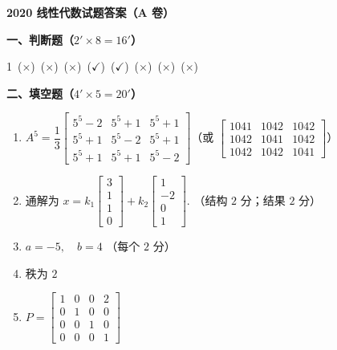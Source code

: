 \documentclass[a4paper,11pt]{ctexart}
\begin{document}
\begin{center}
  {\Large\bfseries 2020 线性代数试题答案（A 卷）}
\end{center}

\vspace{0.6em}

\textbf{一、判断题（$2' \times 8 = 16'$）}

\vspace{0.3em}
1\ ($\times$)\ ($\times$)\ ($\times$)\ ($\checkmark$)\ ($\checkmark$)\ ($\times$)\ ($\times$)\ ($\times$)

\vspace{0.9em}

\textbf{二、填空题（$4' \times 5 = 20'$）}

\begin{enumerate}[label=\arabic*., leftmargin=2em, itemsep=0.6em, topsep=0.4em]
  \item $A^5 = \dfrac{1}{3}\begin{bmatrix} 5^5-2 & 5^5+1 & 5^5+1 \\ 5^5+1 & 5^5-2 & 5^5+1 \\ 5^5+1 & 5^5+1 & 5^5-2 \end{bmatrix}$（或 $\begin{bmatrix} 1041 & 1042 & 1042 \\ 1042 & 1041 & 1042 \\ 1042 & 1042 & 1041 \end{bmatrix}$）

  \item 通解为 $x = k_1\begin{bmatrix} 3 \\ 1 \\ 1 \\ 0 \end{bmatrix} + k_2\begin{bmatrix} 1 \\ -2 \\ 0 \\ 1 \end{bmatrix}$. \qquad （结构 $2$ 分；结果 $2$ 分）

  \item $a = -5,\quad b = 4$ \qquad （每个 $2$ 分）

  \item 秩为 $2$

  \item $P = \begin{bmatrix} 1 & 0 & 0 & 2 \\ 0 & 1 & 0 & 0 \\ 0 & 0 & 1 & 0 \\ 0 & 0 & 0 & 1 \end{bmatrix}$
\end{enumerate}
\end{document}
